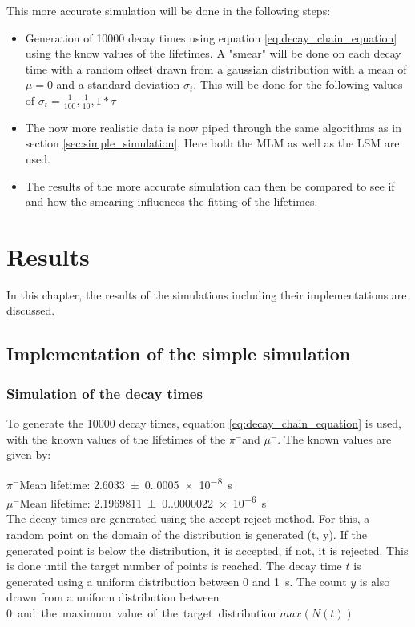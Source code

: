 \documentclass[11pt, a4paper, oneside]{book}
\newcommand{\pion}{$\pi^{-}$}
\newcommand{\muon}{$\mu^{-}$}
\begin{document}
This more accurate simulation will be done in the following steps:
\begin{itemize}
  \item Generation of \num{10000} decay times using equation \ref{eq:decay_chain_equation} using the know values of the lifetimes. A "smear" will be done on each decay time with a random offset drawn from a gaussian distribution with a mean of $\mu = 0$ and a standard deviation $\sigma_t$. This will be done for the following values of $\sigma_t = \frac{1}{100}, \frac{1}{10}, 1 * \tau$
  \item The now more realistic data is now piped through the same algorithms as in section \ref{sec:simple_simulation}. Here both the MLM as well as the LSM are used.
  \item The results of the more accurate simulation can then be compared to see if and how the smearing influences the fitting of the lifetimes.
\end{itemize}


\chapter{Results}

In this chapter, the results of the simulations including their implementations are discussed.

\section{Implementation of the simple simulation} \label{sec:simple_simulation_results}

\subsection{Simulation of the decay times}
To generate the \num{10000} decay times, equation \ref{eq:decay_chain_equation} is used, with the known values of the lifetimes of the \pion and \muon. The known values are given by: \cite{ParticleDataGroup:2024cfk}

\pion Mean lifetime: \qty{2.6033(0.0005)e-8}{\s} \\
\muon Mean lifetime: \qty{2.1969811(0.0000022)e-6}{\s} \\

The decay times are generated using the accept-reject method. For this, a random point on the domain of the distribution is generated (t, y). If the generated point is below the distribution, it is accepted, if not, it is rejected. This is done until the target number of points is reached. 
The decay time $t$ is generated using a uniform distribution between 0 and \qty{1}{\s}. The count $y$ is also drawn from a uniform distribution between \qty{0} and the maximum value of the target distribution $max(N(t))$
\end{document}
